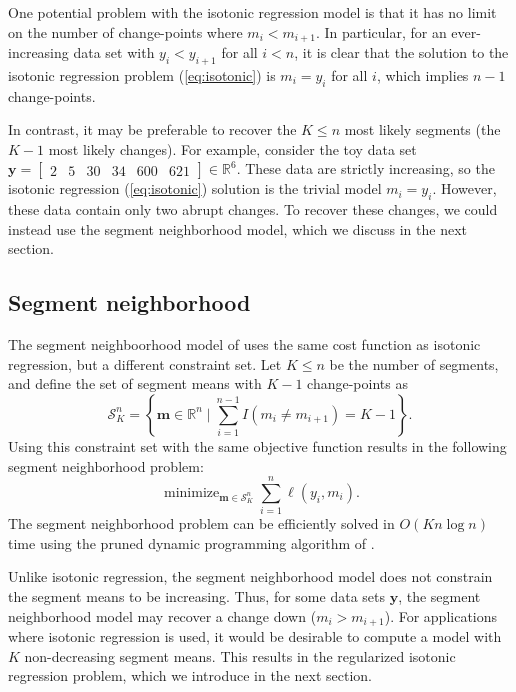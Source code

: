 \documentclass{article}
\DeclareMathOperator*{\minimize}{minimize}
\newcommand{\RR}{\mathbb R}
\begin{document}
One potential problem with the isotonic regression model is that it
has no limit on the number of change-points where $m_i < m_{i+1}$. In
particular, for an ever-increasing data set with $y_i < y_{i+1}$ for
all $i<n$, it is clear that the solution to the isotonic regression
problem (\ref{eq:isotonic}) is $m_i=y_i$ for all $i$, which implies
$n-1$ change-points. 

In contrast, it may be preferable to recover the $K\leq n$ most likely
segments (the $K-1$ most likely changes). For example, consider the
toy data set $\mathbf y= \left[
\begin{array}{cccccc}
  2 & 5 & 30 & 34 & 600 & 621
\end{array}
\right] \in\RR^6$. These data are strictly increasing, so the isotonic
regression (\ref{eq:isotonic}) solution is the trivial model
$m_i=y_i$. However, these data contain only two abrupt changes. To
recover these changes, we could instead use the segment
neighborhood model, which we discuss in the next section.

\subsection{Segment neighborhood}

The segment neighboorhood model of \citet{segment-neighborhood} uses
the same cost function as isotonic regression, but a different
constraint set. Let $K\leq n$ be the number of segments, and define
the set of segment means with $K-1$ change-points as
\begin{equation}
  \label{eq:Sk}
  \mathcal S_K^n = \left\{
  \mathbf m\in\RR^n
  \mid
  \sum_{i=1}^{n-1} I(m_i \neq m_{i+1}) = K-1
  \right\}.
\end{equation}
Using this constraint set with the same objective function results in
the following segment neighborhood problem:
\begin{equation}
  \label{eq:optimal_segment_neighborhood}
  \minimize_{\mathbf m\in\mathcal S_K^n} \sum_{i=1}^n \ell(y_i, m_i).
\end{equation}
The segment neighborhood problem can be efficiently solved in
$O(K n \log n)$ time using the pruned dynamic programming algorithm of
\citet{pruned-dp}.

Unlike isotonic regression, the segment neighborhood model
does not constrain the segment means to be increasing. Thus, for some
data sets $\mathbf y$, the segment neighborhood model may
recover a change down ($m_i > m_{i+1}$). For applications where
isotonic regression is used, it would be desirable to compute a model
with $K$ non-decreasing segment means. This results in the regularized
isotonic regression problem, which we introduce in the next section.
\end{document}
